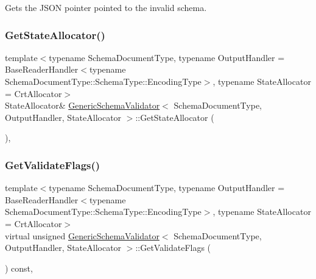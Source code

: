 Gets the J\+S\+ON pointer pointed to the invalid schema. 

\mbox{\label{classGenericSchemaValidator_a84115d2b389b82723a90987c08684cbb}} 
\subsubsection{\texorpdfstring{Get\+State\+Allocator()}{GetStateAllocator()}}
{\footnotesize\ttfamily template$<$typename Schema\+Document\+Type, typename Output\+Handler = Base\+Reader\+Handler$<$typename Schema\+Document\+Type\+::\+Schema\+Type\+::\+Encoding\+Type$>$, typename State\+Allocator = Crt\+Allocator$>$ \\
State\+Allocator\& \hyperlink{classGenericSchemaValidator}{Generic\+Schema\+Validator}$<$ Schema\+Document\+Type, Output\+Handler, State\+Allocator $>$\+::Get\+State\+Allocator (\begin{DoxyParamCaption}{ }\end{DoxyParamCaption})\hspace{0.3cm}{\ttfamily [inline]}, {\ttfamily [private]}}

\mbox{\label{classGenericSchemaValidator_a318bf1cf98d2f18074edd336b1bc684d}} 
\subsubsection{\texorpdfstring{Get\+Validate\+Flags()}{GetValidateFlags()}}
{\footnotesize\ttfamily template$<$typename Schema\+Document\+Type, typename Output\+Handler = Base\+Reader\+Handler$<$typename Schema\+Document\+Type\+::\+Schema\+Type\+::\+Encoding\+Type$>$, typename State\+Allocator = Crt\+Allocator$>$ \\
virtual unsigned \hyperlink{classGenericSchemaValidator}{Generic\+Schema\+Validator}$<$ Schema\+Document\+Type, Output\+Handler, State\+Allocator $>$\+::Get\+Validate\+Flags (\begin{DoxyParamCaption}{ }\end{DoxyParamCaption}) const\hspace{0.3cm}{\ttfamily [inline]}, {\ttfamily [virtual]}}



